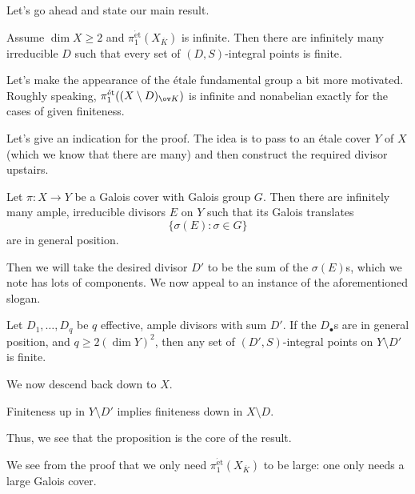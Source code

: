 \documentclass{article}
\begin{document}
Let's go ahead and state our main result.
\begin{theorem}
	Assume $\dim X\ge2$ and $\pi_1^{\mathrm{\acute et}}(X_{\overline K})$ is infinite. Then there are infinitely many irreducible $D$ such that every set of $(D,S)$-integral points is finite.
\end{theorem}
\begin{example}
	Let's make the appearance of the \'etale fundamental group a bit more motivated. Roughly speaking, $\pi_1^{\mathrm{\acute et}}((X\setminus D)_{\ov K})$ is infinite and nonabelian exactly for the cases of given finiteness.
\end{example}
Let's give an indication for the proof. The idea is to pass to an \'etale cover $Y$ of $X$ (which we know that there are many) and then construct the required divisor upstairs.
\begin{proposition}
	Let $\pi\colon X\to Y$ be a Galois cover with Galois group $G$. Then there are infinitely many ample, irreducible divisors $E$ on $Y$ such that its Galois translates
	\[\{\sigma(E):\sigma\in G\}\]
	are in general position.
\end{proposition}
Then we will take the desired divisor $D'$ to be the sum of the $\sigma(E)$s, which we note has lots of components. We now appeal to an instance of the aforementioned slogan.
\begin{theorem}[Levin]
	Let $D_1,\ldots,D_q$ be $q$ effective, ample divisors with sum $D'$. If the $D_\bullet$s are in general position, and $q\ge2(\dim Y)^2$, then any set of $(D',S)$-integral points on $Y\setminus D'$ is finite.
\end{theorem}
We now descend back down to $X$.
\begin{theorem}
	Finiteness up in $Y\setminus D'$ implies finiteness down in $X\setminus D$.
\end{theorem}
Thus, we see that the proposition is the core of the result.
\begin{remark}
	We see from the proof that we only need $\pi_1^{\mathrm{\acute et}}(X_{\overline K})$ to be large: one only needs a large Galois cover.
\end{remark}
\end{document}
